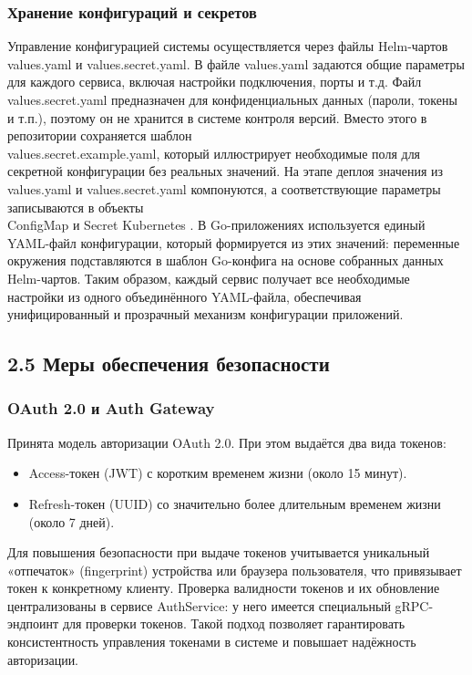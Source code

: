 \subsubsection*{Хранение конфигураций и секретов}
Управление конфигурацией системы осуществляется через файлы Helm-чартов values.yaml и values.secret.yaml. В файле values.yaml задаются общие параметры для каждого сервиса, включая настройки подключения, порты и т.д. Файл values.secret.yaml предназначен для конфиденциальных данных (пароли, токены и т.п.), поэтому он не хранится в системе контроля версий. Вместо этого в репозитории сохраняется шаблон \\ values.secret.example.yaml, который иллюстрирует необходимые поля для секретной конфигурации без реальных значений. На этапе деплоя значения из values.yaml и values.secret.yaml компонуются, а соответствующие параметры записываются в объекты \\ ConfigMap и Secret Kubernetes \cite{3}\cite{4}. В Go-приложениях используется единый YAML-файл конфигурации, который формируется из этих значений: переменные окружения подставляются в шаблон Go-конфига на основе собранных данных Helm-чартов. Таким образом, каждый сервис получает все необходимые настройки из одного объединённого YAML-файла, обеспечивая унифицированный и прозрачный механизм конфигурации приложений.

\subsection*{2.5 Меры обеспечения безопасности}

\subsubsection*{OAuth 2.0 и Auth Gateway}
Принята модель авторизации OAuth 2.0. При этом выдаётся два вида токенов:
\begin{itemize}
    \item Access-токен (JWT) \cite{7} с коротким временем жизни (около 15 минут).
    \item Refresh-токен (UUID) со значительно более длительным временем жизни (около 7 дней).
\end{itemize}
Для повышения безопасности при выдаче токенов учитывается уникальный «отпечаток» (fingerprint) устройства или браузера пользователя, что привязывает токен к конкретному клиенту. Проверка валидности токенов и их обновление централизованы в сервисе AuthService: у него имеется специальный gRPC-эндпоинт для проверки токенов. Такой подход позволяет гарантировать консистентность управления токенами в системе и повышает надёжность авторизации.


